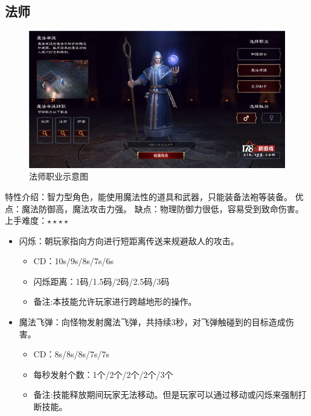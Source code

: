 \documentclass[UTF8,AutoFakeBold=1,AutoFakeSlant,zihao=-4]{cucthesis}
\begin{document}
\subsection{法师}

\begin{figure}[ht]
    \centering
    \includegraphics[scale=0.5]{imgs/法师.jpg}    
    \caption{法师职业示意图}
\end{figure}

特性介绍：智力型角色，能使用魔法性的道具和武器，只能装备法袍等装备。
优点：魔法防御高，魔法攻击力强。 缺点：物理防御力很低，容易受到致命伤害。
上手难度：$\star\star\star\star$


\begin{itemize}
    \item 闪烁：朝玩家指向方向进行短距离传送来规避敌人的攻击。
    \begin{itemize}
        \item CD：10s/9s/8s/7s/6s
        \item 闪烁距离：1码/1.5码/2码/2.5码/3码
        \item 备注:本技能允许玩家进行跨越地形的操作。
    \end{itemize}

    \item 魔法飞弹：向怪物发射魔法飞弹，共持续3秒，对飞弹触碰到的目标造成伤害。
    \begin{itemize}
        \item CD：8s/8s/8s/7s/7s
        \item 每秒发射个数：1个/2个/2个/2个/3个
        \item 备注:技能释放期间玩家无法移动。但是玩家可以通过移动或闪烁来强制打断技能。
    \end{itemize}
\end{itemize}
\end{document}
